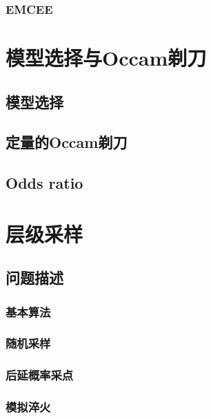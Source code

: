 \subsubsection{EMCEE}

\section{模型选择与Occam剃刀}
\subsection{模型选择}
\subsection{定量的Occam剃刀}
\subsection{Odds ratio}

\section{层级采样}
\subsection{问题描述}
\subsubsection{基本算法}
\subsubsection{随机采样} 
\subsubsection{后延概率采点}
\subsubsection{模拟淬火}
